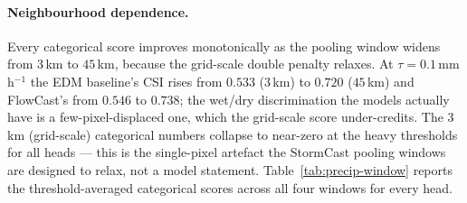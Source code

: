 \paragraph{Neighbourhood dependence.} Every categorical score improves monotonically as the pooling window widens from $3$\,km to $45$\,km, because the grid-scale double penalty relaxes. At $\tau = 0.1$\,mm\,h$^{-1}$ the EDM baseline's CSI rises from $0.533$ ($3$\,km) to $0.720$ ($45$\,km) and FlowCast's from $0.546$ to $0.738$; the wet/dry discrimination the models actually have is a few-pixel-displaced one, which the grid-scale score under-credits. The $3$\,km (grid-scale) categorical numbers collapse to near-zero at the heavy thresholds for all heads --- this is the single-pixel artefact the StormCast pooling windows are designed to relax, not a model statement. Table~\ref{tab:precip-window} reports the threshold-averaged categorical scores across all four windows for every head.

